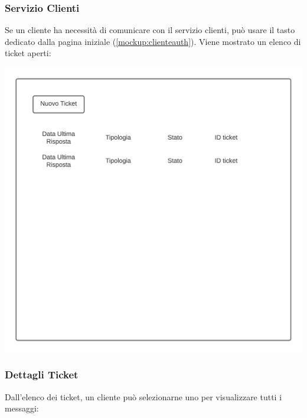 \documentclass[12pt]{article}
\begin{document}
\subsubsection{Servizio Clienti}
\label{mockup:assistenzaclienti}
Se un cliente ha necessità di comunicare con il servizio clienti, può usare il tasto dedicato dalla pagina iniziale (\ref{mockup:clienteauth}). Viene mostrato un elenco di ticket aperti:

\begin{center}
\includegraphics[height=0.3\textheight]{Mockup/Cliente/ElencoTicket}
\end{center}

\newpage

\subsubsection{Dettagli Ticket}
Dall'elenco dei ticket, un cliente può selezionarne uno per visualizzare tutti i messaggi:
\end{document}
